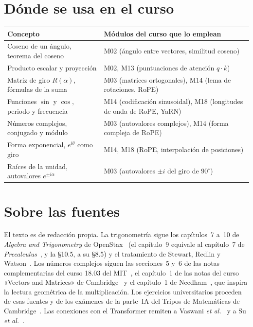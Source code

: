 \documentclass[11pt,a4paper,twoside,openany]{book}
\begin{document}
\section*{Dónde se usa en el curso}
\begin{center}
\small
\begin{tabular}{@{}>{\raggedright\arraybackslash}p{6.0cm}>{\raggedright\arraybackslash}p{7.6cm}@{}}
\toprule
Concepto & Módulos del curso que lo emplean \\
\midrule
Coseno de un ángulo, teorema del coseno & M02 (ángulo entre vectores, similitud coseno) \\
Producto escalar y proyección & M02, M13 (puntuaciones de atención $q\cdot k$) \\
Matriz de giro $R(\alpha)$, fórmulas de la suma & M03 (matrices ortogonales), M14 (lema de rotaciones, RoPE) \\
Funciones $\sin$ y $\cos$, periodo y frecuencia & M14 (codificación sinusoidal), M18 (longitudes de onda de RoPE, YaRN) \\
Números complejos, conjugado y módulo & M03 (autovalores complejos), M14 (forma compleja de RoPE) \\
Forma exponencial, $e^{i\theta}$ como giro & M14, M18 (RoPE, interpolación de posiciones) \\
Raíces de la unidad, autovalores $e^{\pm i\alpha}$ & M03 (autovalores $\pm i$ del giro de $90^{\circ}$) \\
\bottomrule
\end{tabular}
\end{center}

\section*{Sobre las fuentes}
El texto es de redacción propia. La trigonometría sigue los capítulos~7 a~10 de \emph{Algebra and Trigonometry} de OpenStax~\cite{osat} (el capítulo~9 equivale al capítulo~7 de \emph{Precalculus}~\cite{osprecalc}, y la §10.5, a su §8.5) y el tratamiento de Stewart, Redlin y Watson~\cite{stewart}. Los números complejos siguen las secciones~5 y~6 de las notas complementarias del curso 18.03 del MIT~\cite{mit1803}, el capítulo~1 de las notas del curso «Vectors and Matrices» de Cambridge~\cite{cambvm} y el capítulo~1 de Needham~\cite{needham}, que inspira la lectura geométrica de la multiplicación. Los ejercicios universitarios proceden de esas fuentes y de los exámenes de la parte~IA del Tripos de Matemáticas de Cambridge~\cite{tripos2013,tripos2019}. Las conexiones con el Transformer remiten a Vaswani \emph{et al.}~\cite{vaswani} y a Su \emph{et al.}~\cite{roformer}.
\end{document}
